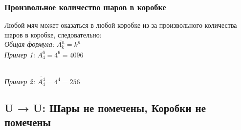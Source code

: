 \documentclass{article}
\begin{document}
            \subsubsection{Произвольное количество шаров в коробке}
                Любой мяч может оказаться в любой коробке из-за произвольного количества шаров в коробке, следовательно:\\
                \textit{Общая формула:} $ \overline{A^n_k} = k^n $\\
                \textit{Пример 1:} $ \overline{A^6_4} = 4^6 = 4096 $
                \begin{figure}[h!]
                \end{figure}\\
                \textit{Пример 2:} $ \overline{A^4_4} = 4^4 = 256 $
                \begin{figure}[h!]
                \end{figure}
        \subsection{U → U: Шары не помечены, Коробки не помечены}
\end{document}
